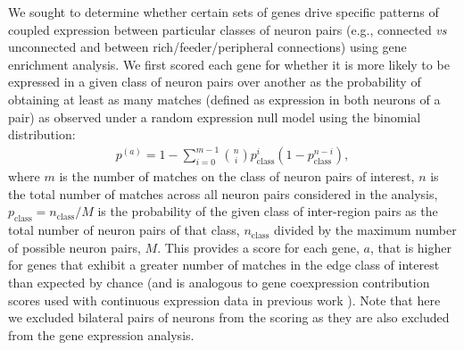 \documentclass[10pt,letterpaper]{article}
\begin{document}
We sought to determine whether certain sets of genes drive specific patterns of coupled expression between particular classes of neuron pairs (e.g., connected \emph{vs} unconnected and between rich/feeder/peripheral connections) using gene enrichment analysis.
We first scored each gene for whether it is more likely to be expressed in a given class of neuron pairs over another as the probability of obtaining at least as many matches (defined as expression in both neurons of a pair) as observed under a random expression null model using the binomial distribution:
\begin{eqnarray}
	\label{eq:CBinomialProbability}
     p^{(a)} = 1 - \sum_{i=0}^{m-1}\binom{n}{i} p_\mathrm{class}^{i}(1-p_\mathrm{class}^{n-i}),
\end{eqnarray}
where $m$ is the number of matches on the class of neuron pairs of interest, $n$ is the total number of matches across all neuron pairs considered in the analysis, $p_\mathrm{class} = n_\mathrm{class}/M$ is the probability of the given class of inter-region pairs as the total number of neuron pairs of that class, $n_\mathrm{class}$ divided by the maximum number of possible neuron pairs, $M$.
This provides a score for each gene, $a$, that is higher for genes that exhibit a greater number of matches in the edge class of interest than expected by chance (and is analogous to gene coexpression contribution scores used with continuous expression data in previous work \cite{Fulcher:2016ck}).
Note that here we excluded bilateral pairs of neurons from the scoring as they are also excluded from the gene expression analysis.
\end{document}
